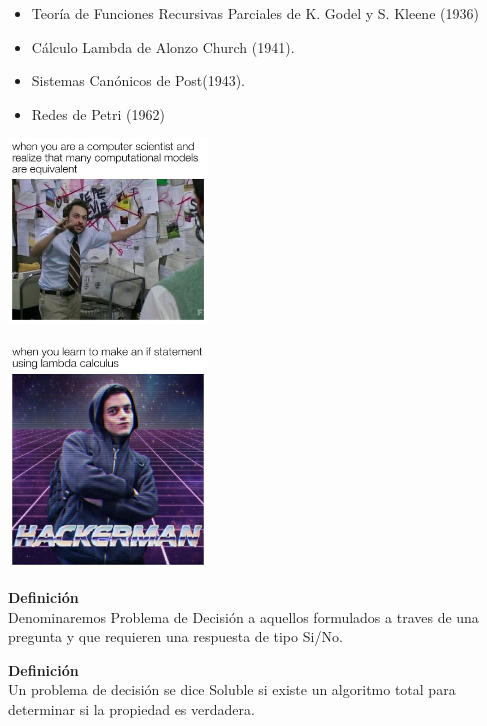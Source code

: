 \documentclass{beamer}                  %
\begin{document}
    \begin{frame}
        \begin{itemize}
            \item Teoría de Funciones Recursivas Parciales de K. Godel y S. Kleene (1936)
            \item Cálculo Lambda de Alonzo Church (1941).
            \item Sistemas Canónicos de Post(1943).
            \item Redes de Petri (1962)
        \end{itemize}

    \end{frame}
    \begin{frame}
    \center\includegraphics[width=200px]{eq}
    \endcenter 
    \end{frame}
    \begin{frame}
    \center\includegraphics[width=200px]{hack0}
    \endcenter 
    \end{frame}
    \begin{frame}

\textbf{Definición}\\
Denominaremos Problema de Decisión a aquellos formulados a traves de una pregunta y que requieren una respuesta de tipo Si/No.
    \bigskip

\textbf{Definición}\\
Un problema de decisión se dice Soluble si existe un algoritmo total para determinar si la propiedad es verdadera.
    \bigskip

    \end{frame}
\end{document}

